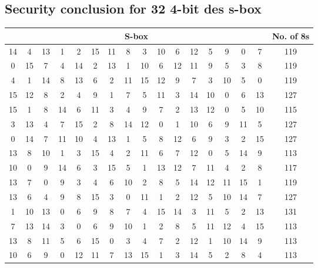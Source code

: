 \documentclass[12pt]{article}
\begin{document}
\subsection{Security conclusion for 32 4-bit des s-box}
\begin{table}[H]
    \centering
    \begin{tabular}{|c|c|c|c|c|c|c|c|c|c|c|c|c|c|c|c|c|}
        \hline
        \multicolumn{16}{|c|}{S-box} & No. of 8s \\
        \hline
        14 & 4 & 13 & 1 & 2 & 15 & 11 & 8 & 3 & 10 & 6 & 12 & 5 & 9 & 0 & 7 & 119 \\
        \hline
        0 & 15 & 7 & 4 & 14 & 2 & 13 & 1 & 10 & 6 & 12 & 11 & 9 & 5 & 3 & 8 & 119 \\
        \hline
        4 & 1 & 14 & 8 & 13 & 6 & 2 & 11 & 15 & 12 & 9 & 7 & 3 & 10 & 5 & 0 & 119 \\
        \hline
        15 & 12 & 8 & 2 & 4 & 9 & 1 & 7 & 5 & 11 & 3 & 14 & 10 & 0 & 6 & 13 & 127 \\
        \hline
        15 & 1 & 8 & 14 & 6 & 11 & 3 & 4 & 9 & 7 & 2 & 13 & 12 & 0 & 5 & 10 & 115 \\
        \hline
        3 & 13 & 4 & 7 & 15 & 2 & 8 & 14 & 12 & 0 & 1 & 10 & 6 & 9 & 11 & 5 & 127 \\
        \hline
        0 & 14 & 7 & 11 & 10 & 4 & 13 & 1 & 5 & 8 & 12 & 6 & 9 & 3 & 2 & 15 & 127 \\
        \hline
        13 & 8 & 10 & 1 & 3 & 15 & 4 & 2 & 11 & 6 & 7 & 12 & 0 & 5 & 14 & 9 & 113 \\
        \hline
        10 & 0 & 9 & 14 & 6 & 3 & 15 & 5 & 1 & 13 & 12 & 7 & 11 & 4 & 2 & 8 & 117 \\
        \hline
        13 & 7 & 0 & 9 & 3 & 4 & 6 & 10 & 2 & 8 & 5 & 14 & 12 & 11 & 15 & 1 & 119 \\
        \hline
        13 & 6 & 4 & 9 & 8 & 15 & 3 & 0 & 11 & 1 & 2 & 12 & 5 & 10 & 14 & 7 & 127 \\
        \hline
        1 & 10 & 13 & 0 & 6 & 9 & 8 & 7 & 4 & 15 & 14 & 3 & 11 & 5 & 2 & 13 & 131 \\
        \hline
        7 & 13 & 14 & 3 & 0 & 6 & 9 & 10 & 1 & 2 & 8 & 5 & 11 & 12 & 4 & 15 & 113 \\
        \hline
        13 & 8 & 11 & 5 & 6 & 15 & 0 & 3 & 4 & 7 & 2 & 12 & 1 & 10 & 14 & 9 & 113 \\
        \hline
        10 & 6 & 9 & 0 & 12 & 11 & 7 & 13 & 15 & 1 & 3 & 14 & 5 & 2 & 8 & 4 & 113 \\
        \hline

\end{tabular}
\end{table}
\end{document}
